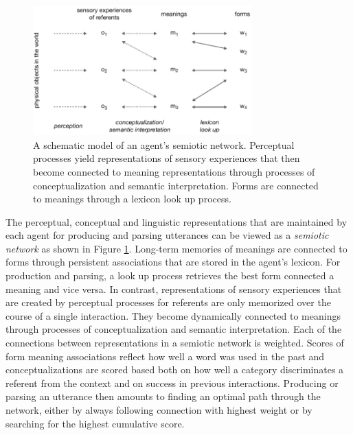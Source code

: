 \begin{figure}[t]
  \centerline{\includegraphics[width=0.75\textwidth]{figures/semiotic-network-example}}
  \caption{A schematic model of an agent's semiotic
    network. Perceptual processes yield representations of sensory
    experiences that then become connected to meaning representations
    through processes of conceptualization and semantic
    interpretation. Forms are connected to meanings through a lexicon
    look up process.}
  \label{f:semiotic-network-example}
\end{figure}


The perceptual, conceptual and linguistic representations that are
maintained by each agent for producing and parsing utterances can be
viewed as a \emph{semiotic network} as shown in Figure
\ref{f:semiotic-network-example}. Long-term memories of meanings are
connected to forms through persistent associations that are stored in
the agent's lexicon. For production and parsing, a look up process
retrieves the best form connected a meaning and vice versa. In
contrast, representations of sensory experiences that are created by
perceptual processes for referents are only memorized over the course
of a single interaction. They become dynamically connected to meanings
through processes of conceptualization and semantic
interpretation. Each of the connections between representations in a
semiotic network is weighted. Scores of form meaning associations
reflect how well a word was used in the past and conceptualizations
are scored based both on how well a category discriminates a referent
from the context and on success in previous interactions. Producing or
parsing an utterance then amounts to finding an optimal path through
the network, either by always following connection with highest weight
or by searching for the highest cumulative score.


